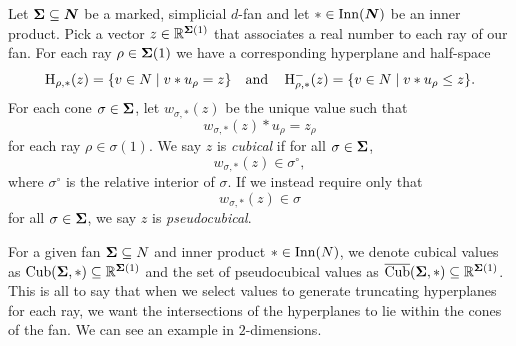 \documentclass[12pt,oneside]{../../sfsuthesis}
\begin{document}
\begin{definition}\th\label{def:cubical}
    Let \( {\bm{\Sigma}} \subseteq \bm{N} \) be a marked, simplicial \( d \)-fan and let \( \ast \in \operatorname{Inn}(\bm{N}) \) be an inner product.
    Pick a vector \( z \in \mathbb{R}^{{\bm{\Sigma}}(1)} \) that associates a real number to each ray of our fan.
    For each ray \( \rho \in {\bm{\Sigma}}(1) \) we have a corresponding hyperplane and half-space
    \[
        \operatorname{H}_{\rho, \ast}(z) = \{ v \in N \; | \; v \ast u_\rho = z \}
        \quad \text{and} \quad
        \operatorname{H}^{-}_{\rho, \ast}(z) = \{ v \in N \; | \; v \ast u_\rho \leq z \}.
    \]
    For each cone \( \sigma \in {\bm{\Sigma}} \), let \( w_{\sigma,\ast}(z) \) be the unique value such that
    \[
        w_{\sigma, \ast}(z) \ast u_\rho = z_\rho
    \]
    for each ray \(\rho \in \sigma(1)\).
    We say \( z \) is \emph{cubical} if for all \( \sigma \in {\bm{\Sigma}} \),
    \[
        w_{\sigma, \ast}(z)  \in \sigma^\circ,
    \]
    where \( \sigma^\circ \) is the relative interior of \( \sigma \).
    If we instead require only that
    \[
        w_{\sigma, \ast}(z) \in \sigma
    \]
    for all \( \sigma \in {\bm{\Sigma}} \), we say \( z \) is \emph{pseudocubical}.
\end{definition}
For a given fan \( {\bm{\Sigma}} \subseteq N \) and inner product \( \ast \in \operatorname{Inn}(N) \), we denote cubical values as \( \operatorname{Cub}({\bm{\Sigma}}, \ast) \subseteq \mathbb{R}^{{\bm{\Sigma}}(1)} \) and the set of pseudocubical values as \( \operatorname{\overline{Cub}}({\bm{\Sigma}}, \ast) \subseteq \mathbb{R}^{{\bm{\Sigma}}(1)} \).
This is all to say that when we select values to generate truncating hyperplanes for each ray, we want the intersections of the hyperplanes to lie within the cones of the fan.
We can see an example in \( 2 \)-dimensions.
\end{document}
